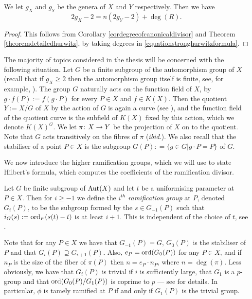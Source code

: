     \begin{cor}\label{corhurwitzformula}
    We let $g_X$ and $g_Y$ be the genera of $X$ and $Y$ respectively.
    Then we have
        \[
        2g_X - 2 = n(2g_Y -2) + \deg(R).
        \]
    \end{cor}
    \begin{proof}
    This follows from Corollary \ref{cordegreeofcanonicaldivisor} and Theorem \ref{theoremdetailedhurwitz}, by taking degrees in \eqref{equationstronghurwitzformula}.
    \end{proof}

The majority of topics considered in the thesis will be concerned with the following situation.
Let $G$ be a finite subgroup of the automorphism group of $X$ (recall that if $g_X \geq 2$ then the automorphism group itself is finite, see, for example, \cite{finiteautomorphismofcurves}).
The group $G$ naturally acts on the function field of $X$, by $g\cdot f(P) := f(g \cdot P)$ for every $P \in X$ and $f \in K(X)$.
Then the quotient $Y := X/G$ of $X$ by the action of $G$ is again a curve (see \cite[Chap.\ 2, \S 1.7, Ex.\ 8]{pretendshafarevichalggeom1}), and the function field of the quotient curve is the subfield of $K(X)$ fixed by this action, which we denote $K(X)^G$.
We let $\pi \colon X \rightarrow Y$ be the projection of $X$ on to the quotient.
Note that $G$ acts transitively on the fibres of $\pi$ (\textit{ibid.}).
We also recall that the stabiliser of a point $P \in X$ is the subgroup $G(P) : = \{ g \in G | g \cdot P = P\}$ of $G$.


We now introduce the higher ramification groups, which we will use to state Hilbert's formula, which computes the coefficients of the ramification divisor.

   \begin{defn}
    Let $G$ be finite subgroup of $\operatorname{Aut}(X)$ and let $t$ be a uniformising parameter at $P\in X$.
    Then for $i\geq -1$ we define the \emph{$i^{th}$ ramification group} at $P$, denoted $G_i(P)$, to be the subgroup formed by the $s\in G_{-1}(P)$ such that $i_G(s) := \operatorname{ord}_P(s(t)-t)$ is at least $i+1$.
    This is	independent of the choice of $t$, see \cite[Chap. IV, \S 1, pg. 62]{localfields}.
    \end{defn}

Note that for any $P\in X$ we have that $G_{-1}(P)=G$, $G_0(P)$ is the stabiliser of $P$ and that $G_i(P)\supseteq G_{i+1}(P)$.
Also, $e_P = \operatorname{ord} (G_0(P))$ for any $P \in X$, and if $n_P$ is the size of the fiber of $\pi(P)$ then $n = e_P\cdot n_P$, where $n = \deg(\pi)$.
Less obviously, we have that $G_i(P)$ is trivial if $i$ is sufficiently large, that $G_1$ is a $p$-group and that $\operatorname{ord}(G_0(P)/G_1(P))$ is coprime to $p$ ---  see \cite[Chap. IV, \S 1]{localfields} for details.
In particular, $\phi$ is tamely ramified at $P$ if and only if $G_1(P)$ is the trivial group.




